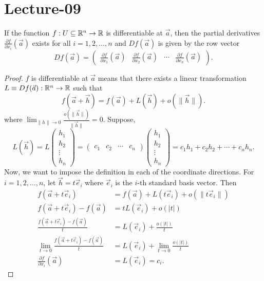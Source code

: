 \newpage
\section{Lecture-09}
\begin{proposition}
  If the function $f:U\subseteq \mathbb{R}^n \to \mathbb{R}$ is differentiable at $\vec a$, then the partial derivatives 
  $\frac{\partial f}{\partial x_i}(\vec a)$ exists for all $i=1,2,\ldots,n$ and $Df(\vec a)$ is given by the row vector
  \[
  Df(\vec a) = \begin{pmatrix}
  \frac{\partial f}{\partial x_1}(\vec a) & \frac{\partial f}{\partial x_2}(\vec a) & \cdots & \frac{\partial f}{\partial x_n}(\vec a)
  \end{pmatrix}.
  \] 
\end{proposition}
\begin{proof}
  $f$ is differentiable at $\vec a$ means that there exists a linear transformation $L\equiv Df(\vec a):\mathbb{R}^n \to \mathbb{R}$ such that
  \[
  f(\vec a+\vec h)=f(\vec a)+L(\vec h)+o(\|\vec h\|).
  \]
  where $\lim_{\|h\|\rightarrow 0} \frac{o(\|\vec h\|)}{\|\vec h\|}=0$. Suppose, 
  $$L(\vec h)=L\begin{pmatrix}h_1\\h_2\\\vdots\\h_n\end{pmatrix}=\begin{pmatrix}
  c_1 & c_2 & \cdots & c_n
  \end{pmatrix}\begin{pmatrix}h_1\\h_2\\\vdots\\h_n\end{pmatrix}=c_1h_1+c_2h_2+\cdots+c_nh_n.$$
  Now, we want to impose the definition in each of the coordinate directions. For $i=1,2,\ldots,n$, let $\vec h = t \vec e_i$ where $\vec e_i$ is the $i$-th standard basis vector. Then
  \begin{align*}
  f(\vec a+t\vec e_i)&=f(\vec a)+L(t\vec e_i)+o(\|t\vec e_i\|)\\
  f(\vec a+t\vec e_i) - f(\vec a) &= t L(\vec e_i) + o(|t|)\\
  \frac{f(\vec a+t\vec e_i) - f(\vec a)}{t} &= L(\vec e_i) + \frac{o(|t|)}{t}\\
  \lim_{t \to 0} \frac{f(\vec a+t\vec e_i) - f(\vec a)}{t} &= L(\vec e_i) + \lim_{t \to 0} \frac{o(|t|)}{t}\\
  \frac{\partial f}{\partial x_i}(\vec a) &= L(\vec e_i) = c_i.
  \end{align*}
\end{proof}
